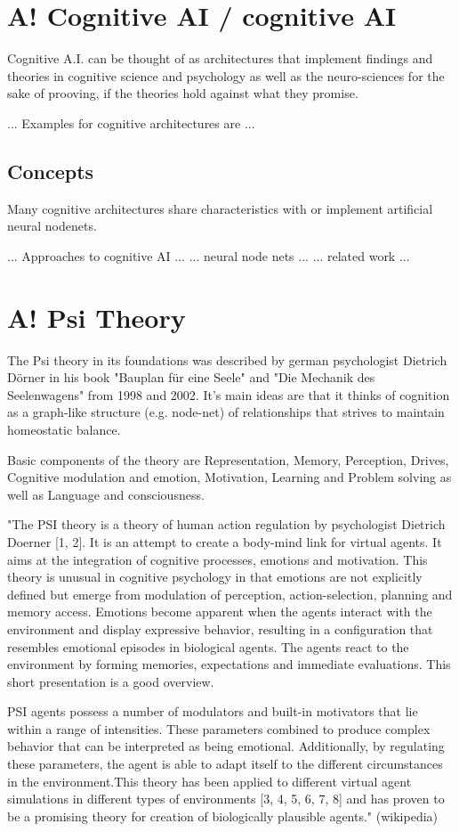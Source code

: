 \section{A! Cognitive AI / cognitive AI}
Cognitive A.I. can be thought of as architectures that implement findings and theories in cognitive science and psychology as well as the neuro-sciences for the sake of prooving, if the theories hold against what they promise. 

... Examples for cognitive architectures are ...
\subsection{Concepts}
Many cognitive architectures share characteristics with or implement artificial neural nodenets.

... Approaches to cognitive AI ...
... neural node nets ...
... related work ...

\section{A! Psi Theory}
The Psi theory in its foundations was described by german psychologist Dietrich Dörner in his book "Bauplan für eine Seele" and "Die Mechanik des Seelenwagens" from 1998 and 2002. It's main ideas are that it thinks of cognition as a graph-like structure (e.g. node-net) of relationships that strives to maintain homeostatic balance.\cite{Bach:2009:PSI:1611304}

Basic components of the theory are Representation, Memory, Perception, Drives, Cognitive modulation and emotion, Motivation, Learning and Problem solving as well as Language and consciousness.

"The PSI theory is a theory of human action regulation by psychologist Dietrich Doerner [1, 2]. It is an attempt to create a body-mind link for virtual agents. It aims at the integration of cognitive processes, emotions and motivation. This theory is unusual in cognitive psychology in that emotions are not explicitly defined but emerge from modulation of perception, action-selection, planning and memory access. Emotions become apparent when the agents interact with the environment and display expressive behavior, resulting in a configuration that resembles emotional episodes in biological agents. The agents react to the environment by forming memories, expectations and immediate evaluations. This short presentation is a good overview.

PSI agents possess a number of modulators and built-in motivators that lie within a range of intensities. These parameters combined to produce complex behavior that can be interpreted as being emotional. Additionally, by regulating these parameters, the agent is able to adapt itself to the different circumstances in the environment.This theory has been applied to different virtual agent simulations in different types of environments [3, 4, 5, 6, 7, 8] and has proven to be a promising theory for creation of biologically plausible agents." (wikipedia)


